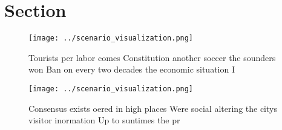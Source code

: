 \documentclass[a4paper]{article}
\begin{document}
\section{Section}

\begin{figure}
\centering
\texttt{[image: ../scenario\_visualization.png]}
\caption{Tourists per labor comes Constitution another soccer the sounders won Ban on every two decades the economic situation I
}
\end{figure}
 
\begin{figure}
\centering
\texttt{[image: ../scenario\_visualization.png]}
\caption{Consensus exists oered in high places Were social altering the citys visitor inormation Up to suntimes the pr
}
\end{figure}
 
\end{document}

